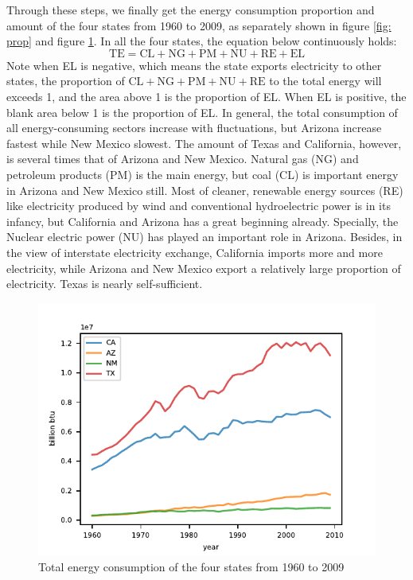 Through these steps, we finally get the energy consumption proportion and amount of the four states from 1960 to 2009, as separately shown in figure \ref{fig: prop} and figure \ref{fig: energy quantity}. In all the four states, the equation below  continuously holds:
\begin{equation}
\mathrm{TE} = \mathrm{CL}+\mathrm{NG}+\mathrm{PM}+\mathrm{NU}+\mathrm{RE}+\mathrm{EL}
\end{equation}
Note when EL is negative, which means the state exports electricity to other states, the proportion of  $\mathrm{CL}+\mathrm{NG}+\mathrm{PM}+\mathrm{NU}+\mathrm{RE}$ to the total energy will exceeds 1, and the area above 1 is the proportion of EL. When EL is positive, the blank area below 1 is the proportion of EL.
In general, the total consumption of all energy-consuming sectors increase with fluctuations, but Arizona increase fastest while New Mexico slowest. The amount of Texas and California, however, is several times that of Arizona and New Mexico. Natural gas (NG) and petroleum products (PM) is the main energy, but coal (CL) is important energy in Arizona and New Mexico still. Most of cleaner, renewable energy sources (RE) like electricity produced by wind and conventional hydroelectric power is in its infancy, but California and Arizona has a great beginning already. Specially, the Nuclear electric power (NU) has played an important role in Arizona. Besides, in the view of interstate electricity exchange, California imports more and more electricity, while Arizona and New Mexico export a relatively large proportion of electricity. Texas is nearly self-sufficient. 

\begin{figure}[H] 
    \centering 
    \includegraphics[width=0.5\linewidth]{fig/amount.pdf}
    \caption{Total energy consumption of the four states from 1960 to 2009}
    \label{fig: energy quantity}
\end{figure}


